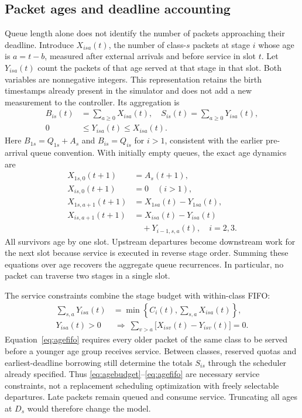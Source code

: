 \documentclass{IEEEoj}
\begin{document}
\subsection{Packet ages and deadline accounting}
Queue length alone does not identify the number of packets approaching their
deadline. Introduce $X_{isa}(t)$, the number of class-$s$ packets at stage $i$
whose age is $a=t-b$, measured after external arrivals and before service in
slot $t$. Let $Y_{isa}(t)$ count the packets of that age served at that stage
in that slot. Both variables are nonnegative integers. This representation
retains the birth timestamps already present in the simulator and does not
add a new measurement to the controller. Its aggregation is
\begin{equation}
\begin{aligned}
 B_{is}(t)&=\sum_{a\ge0}X_{isa}(t),\quad S_{is}(t)=\sum_{a\ge0}Y_{isa}(t),\\
 0&\le Y_{isa}(t)\le X_{isa}(t).
\end{aligned}
\label{eq:ageaggregate}
\end{equation}
Here $B_{1s}=Q_{1s}+A_s$ and $B_{is}=Q_{is}$ for $i>1$, consistent with the
earlier pre-arrival queue convention. With initially empty queues, the exact
age dynamics are
\begin{align}
 X_{1s,0}(t+1)&=A_s(t+1),\nonumber\\X_{is,0}(t+1)&=0\quad(i>1),\label{eq:agebirth}\\
 X_{1s,a+1}(t+1)&=X_{1sa}(t)-Y_{1sa}(t),\label{eq:agefirst}\\
 X_{is,a+1}(t+1)&=X_{isa}(t)-Y_{isa}(t)\nonumber\\&\quad+Y_{i-1,s,a}(t),\quad i=2,3.\label{eq:agetransit}
\end{align}
All survivors age by one slot. Upstream departures become downstream work
for the next slot because service is executed in reverse stage order.
Summing these equations over age recovers the aggregate queue recurrences.
In particular, no packet can traverse two stages in a single slot.

The service constraints combine the stage budget with within-class FIFO:
\begin{align}
 \sum_{s,a}Y_{isa}(t)&=\min\!\left\{C_i(t),\sum_{s,a}X_{isa}(t)\right\},
 \label{eq:agebudget}\\
 Y_{isa}(t)>0&\ \Longrightarrow\
 \sum_{v>a}\bigl[X_{isv}(t)-Y_{isv}(t)\bigr]=0.
 \label{eq:agefifo}
\end{align}
Equation~\eqref{eq:agefifo} requires every older packet of the same class to
be served before a younger age group receives service. Between classes,
reserved quotas and earliest-deadline borrowing still determine the totals
$S_{is}$ through the scheduler already specified. Thus
\eqref{eq:agebudget}--\eqref{eq:agefifo} are necessary service constraints,
not a replacement scheduling optimization with freely selectable departures.
Late packets remain queued and consume service. Truncating all ages at $D_s$
would therefore change the model.
\end{document}
